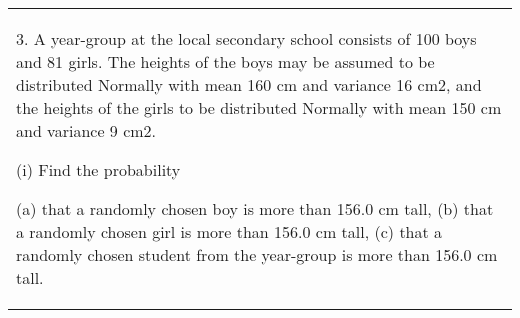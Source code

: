\documentclass[a4paper,12pt]{article}
\begin{document}
  \begin{table}[ht!]
  \centering
  \begin{tabular}{|p{15cm}|}
  \hline
3. A year-group at the local secondary school consists of 100 boys and 81 girls.  The heights of the boys may be assumed to be distributed Normally with mean 160 cm and variance 16 cm2, and the heights of the girls to be distributed Normally with mean 150 cm and variance 9 cm2. 
 
(i) Find the probability 
 
  (a) that a randomly chosen boy is more than 156.0 cm tall,   
  (b) that a randomly chosen girl is more than 156.0 cm tall,   
  (c) that a randomly chosen student from the year-group is more than 156.0 cm tall.     
  \hline
   \end{tabular}
 \end{table}
 
\end{document}
